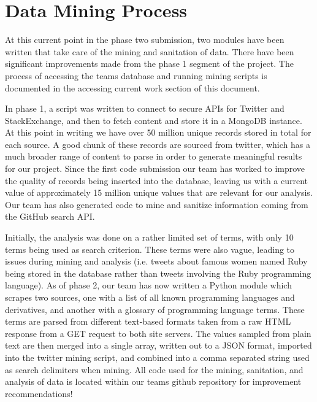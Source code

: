 \documentclass{sig-alternate}
\begin{document}
\section{Data Mining Process}
\label{data mining process}

At this current point in the phase two submission, two modules have been written
that take care of the mining and sanitation of data. There have been significant improvements made from the phase 1 segment of the project. The process of accessing the teams database and running mining scripts is documented in the accessing current work section of this document. 

In phase 1, a script was written to connect to secure APIs for Twitter and StackExchange, and then to fetch content and store it in a MongoDB instance. At this point in writing we have over 50 million unique records stored in total for each source. A good chunk of these records are sourced from twitter, which has a much broader range of content to parse in order to generate meaningful results for our project. Since the first code submission our team has worked to improve the quality of records being inserted into the database, leaving us with a current value of approximately 15 million unique values that are relevant for our analysis. Our team has also generated code to mine and sanitize information coming from the GitHub search API. 

Initially, the analysis was done on a rather limited set of terms, with only 10 terms being used as search criterion. These terms were also  vague, leading to issues during mining and analysis (i.e. tweets about famous women named \textsc{}Ruby\textsc{} being stored in the database rather than tweets involving the Ruby programming language). As of phase 2, our team has now written a Python module which scrapes two sources, one with a list of all known programming languages and derivatives, \cite{ProgrammingTerms} and another with a glossary of programming language terms. \cite{ProgrammingLanguages} These terms are parsed from different text-based formats taken from a raw HTML response from a GET request to both site servers. The values sampled from plain text are then merged into a single array, written out to a JSON format, imported into the twitter mining script, and combined into a comma separated string used as search delimiters when mining. All code used for the mining, sanitation, and analysis of data is located within our team\textsc{}s github repository for improvement recommendations! \cite{GroupRepo}
\end{document}
